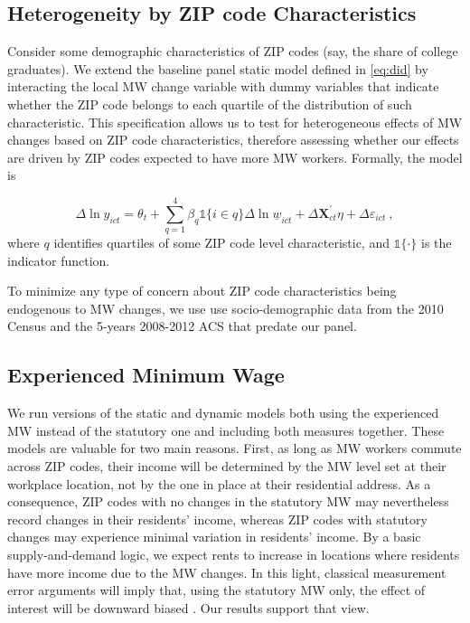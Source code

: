 \subsection{Heterogeneity by ZIP code Characteristics}\label{sec:strategy_heterogeneity}

Consider some demographic characteristics of ZIP codes (say, the share of college graduates).
We extend the baseline panel static model defined in \autoref{eq:did} by interacting the local 
MW change variable with dummy variables that indicate whether the ZIP code belongs to each 
quartile of the distribution of such characteristic. This specification allows us to test for 
heterogeneous effects of MW changes based on ZIP code characteristics, therefore assessing 
whether our effects are driven by ZIP codes expected to have more MW workers. Formally, the 
model is

\begin{equation}\label{eq:diff_main_hetero} 
    \Delta \ln y_{ict} = \theta_t
    				+ \sum_{q = 1}^4 \beta_q \mathds{1}\{i \in q\} \Delta \ln \underline{w}_{ict}
    				+ \Delta \mathbf{X}^{'}_{ct}\eta
    				+ \Delta \varepsilon_{ict} \ ,
\end{equation}
where $q$ identifies quartiles of some ZIP code level characteristic, and $\mathds{1}\{\cdot\}$ 
is the indicator function.

To minimize any type of concern about ZIP code characteristics being endogenous to MW changes, 
we use use socio-demographic data from the 2010 Census and the 5-years 2008-2012 ACS that 
predate our panel.


\subsection{Experienced Minimum Wage}\label{sec:emp_strategy_expmw}

We run versions of the static and dynamic models both using the experienced MW instead 
of the statutory one and including both measures together. These models are valuable for two main 
reasons. First, as long as MW workers commute across ZIP codes, their income will be determined 
by the MW level set at their workplace location, not by the one in place at their residential 
address. As a consequence, ZIP codes with no changes in the statutory MW may nevertheless record 
changes in their residents' income, whereas ZIP codes with statutory changes may experience minimal 
variation in residents' income. By a basic supply-and-demand logic, we expect rents to increase in 
locations where residents have more income due to the MW changes. In this light, classical 
measurement error arguments will imply that, using the statutory MW only, the effect of interest 
will be downward biased \parencite{AngristPischke2009}. Our results support that view. 

